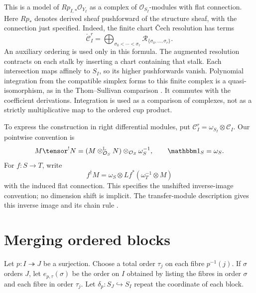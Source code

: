 This is a model of $Rp_{I,*}\mathcal O_{Y_I}$ as a complex of
$\mathcal O_{S_I}$-modules with flat connection. Here $Rp_*$
denotes derived sheaf pushforward of the structure sheaf, with
the connection just specified. Indeed, the finite chart
\v{C}ech resolution has terms
\[
 \check{\mathcal C}_I^r=
 \bigoplus_{\sigma_0<\cdots<\sigma_r}
 \mathcal R_{\{\sigma_0,\ldots,\sigma_r\}}.
\]
An auxiliary ordering is used only in this formula.
The augmented resolution contracts on each stalk by inserting a
chart containing that stalk. Each intersection maps affinely to
$S_I$, so its higher pushforwards vanish. Polynomial integration
from the compatible simplex forms to this finite complex is a
quasi-isomorphism, as in the Thom--Sullivan comparison
\cite[Appendix A.3]{AKY24}. It commutes with the coefficient
derivations. Integration is used as a comparison of complexes,
not as a strictly multiplicative map to the ordered cup product.

To express the construction in right differential modules, put
$\mathcal C_I^r=\omega_{S_I}\otimes\mathcal C_I$.
Our pointwise convention is
\[
 M\tensor^!N=(M\otimes_{\mathcal O_S}^{\mathbb L}N)
                  \otimes_{\mathcal O_S}\omega_S^{-1},
 \qquad\mathbbm1_S=\omega_S.
\]
For $f:S\to T$, write
\[
 f^\dagger M=\omega_S\otimes
 Lf^*(\omega_T^{-1}\otimes M)
\]
with the induced flat connection. This specifies the unshifted
inverse-image convention; no dimension shift is implicit.
The transfer-module description gives this inverse image and its
chain rule \cite[\S28.5, equation (21)]{EtingofD28}.

\section{Merging ordered blocks}

Let $p:I\twoheadrightarrow J$ be a surjection. Choose a total
order $\tau_j$ on each fibre $p^{-1}(j)$. If $\sigma$ orders $J$,
let $e_{p,\tau}(\sigma)$ be the order on $I$ obtained by listing
the fibres in order $\sigma$ and each fibre in order $\tau_j$.
Let $\delta_p:S_J\hookrightarrow S_I$ repeat the coordinate of
each block.

